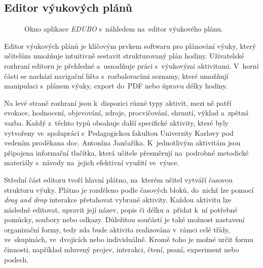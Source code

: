 \documentclass[male,czech,api_bc]{kitheses}
\begin{document}
\subsection{Editor výukových plánů}

\begin{figure}[H]
	\centering
	\caption{Okno aplikace \textit{EDUBO} s~náhledem na~editor výukového plánu.}
	\label{fig:edubo-1}
\end{figure}

Editor výukových plánů je klíčovým prvkem softwaru pro plánování výuky, který učitelům umožňuje intuitivně sestavit strukturovaný plán hodiny. Uživatelské rozhraní editoru je přehledné a~usnadňuje práci s~výukovými aktivitami. V~horní části se nachází navigační lišta s~rozbalovacími seznamy, které umožňují manipulaci s~plánem výuky, export do~PDF nebo úpravu délky hodiny.

Na levé straně rozhraní jsou k~dispozici různé typy aktivit, mezi ně patří evokace, hodnocení, objevování, zdroje, procvičování, shrnutí, výklad a~zpětná vazba. Každý z~těchto typů obsahuje další specifické aktivity, které byly vytvořeny ve~spolupráci s~Pedagogickou fakultou Univerzity Karlovy pod vedením proděkana doc. Antonína Jančaříka. K~jednotlivým aktivitám jsou připojena informační tlačítka, která učitele přesměrují na~podrobné metodické materiály s~návody na~jejich efektivní využití ve~výuce.

Střední část editoru tvoří hlavní plátno, na~kterém učitel vytváří časovou strukturu výuky. Plátno je rozděleno podle časových bloků, do~nichž lze pomocí \textit{drag and drop} interakce přetahovat vybrané aktivity. Každou aktivitu lze následně editovat, upravit její název, popis či délku a~přidat k~ní potřebné pomůcky, soubory nebo odkazy. Důležitou součástí je také možnost nastavení organizační formy, tedy zda bude aktivita realizována v~rámci celé třídy, ve~skupinách, ve~dvojicích nebo individuálně. Kromě toho je možné určit formu činnosti, například mluvený projev, interakci, čtení, psaní, experiment nebo poslech.
\end{document}

